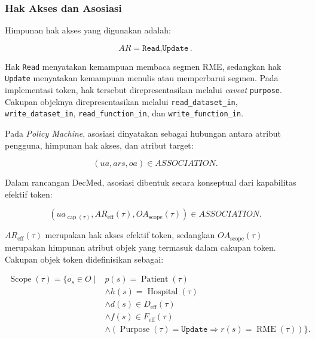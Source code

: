 \subsubsection{Hak Akses dan Asosiasi}

Himpunan hak akses yang digunakan adalah:

\begin{equation}
	AR = {\texttt{Read},\texttt{Update}}.
\end{equation}

Hak \texttt{Read} menyatakan kemampuan membaca segmen RME, sedangkan hak \texttt{Update} menyatakan kemampuan menulis atau memperbarui segmen. Pada implementasi token, hak tersebut direpresentasikan melalui \textit{caveat} \texttt{purpose}. Cakupan objeknya direpresentasikan melalui \texttt{read\_dataset\_in}, \texttt{write\_dataset\_in}, \texttt{read\_function\_in}, dan \texttt{write\_function\_in}.

Pada \textit{Policy Machine}, asosiasi dinyatakan sebagai hubungan antara atribut pengguna, himpunan hak akses, dan atribut target:

\begin{equation}
	(ua, ars, oa) \in ASSOCIATION.
\end{equation}

Dalam rancangan DecMed, asosiasi dibentuk secara konseptual dari kapabilitas efektif token:

\begin{equation}
	\left(
	ua_{\operatorname{cap}(\tau)},
	AR_{\operatorname{eff}}(\tau),
	OA_{\operatorname{scope}}(\tau)
	\right)
	\in ASSOCIATION.
\end{equation}

$AR_{\operatorname{eff}}(\tau)$ merupakan hak akses efektif token, sedangkan $OA_{\operatorname{scope}}(\tau)$ merupakan himpunan atribut objek yang termasuk dalam cakupan token. Cakupan objek token didefinisikan sebagai:

\begin{equation}
	\begin{split}
		\operatorname{Scope}(\tau)
		=
		\{ o_s \in O \mid {} &
		p(s)=\operatorname{Patient}(\tau)                                 \\
		                     & \land h(s)=\operatorname{Hospital}(\tau)   \\
		                     & \land d(s)\in D_{\operatorname{eff}}(\tau) \\
		                     & \land f(s)\in F_{\operatorname{eff}}(\tau) \\
		                     & \land
		(
		\operatorname{Purpose}(\tau)=\texttt{Update}
		\Rightarrow
		r(s)=\operatorname{RME}(\tau)
		)
		\}.
	\end{split}
\end{equation}

